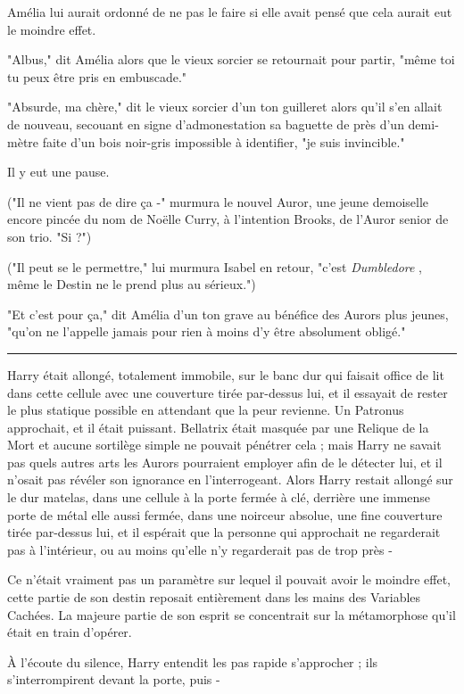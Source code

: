 Amélia lui aurait ordonné de ne pas le faire si elle avait pensé que cela aurait eut le moindre effet.

"Albus," dit Amélia alors que le vieux sorcier se retournait pour partir, "même toi tu peux être pris en embuscade."

"Absurde, ma chère," dit le vieux sorcier d'un ton guilleret alors qu'il s'en allait de nouveau, secouant en signe d'admonestation sa baguette de près d'un demi-mètre faite d'un bois noir-gris impossible à identifier, "je suis invincible."

Il y eut une pause.

("Il ne vient pas de dire ça -" murmura le nouvel Auror, une jeune demoiselle encore pincée du nom de Noëlle Curry, à l'intention Brooks, de l'Auror senior de son trio. "Si ?")

("Il peut se le permettre," lui murmura Isabel en retour, "c'est \emph{Dumbledore} , même le Destin ne le prend plus au sérieux.")

"Et c'est pour ça," dit Amélia d'un ton grave au bénéfice des Aurors plus jeunes, "qu'on ne l'appelle jamais pour rien à moins d'y être absolument obligé."
\par\noindent\rule{\textwidth}{0.4pt}
Harry était allongé, totalement immobile, sur le banc dur qui faisait office de lit dans cette cellule avec une couverture tirée par-dessus lui, et il essayait de rester le plus statique possible en attendant que la peur revienne. Un Patronus approchait, et il était puissant. Bellatrix était masquée par une Relique de la Mort et aucune sortilège simple ne pouvait pénétrer cela ; mais Harry ne savait pas quels autres arts les Aurors pourraient employer afin de le détecter lui, et il n'osait pas révéler son ignorance en l'interrogeant. Alors Harry restait allongé sur le dur matelas, dans une cellule à la porte fermée à clé, derrière une immense porte de métal elle aussi fermée, dans une noirceur absolue, une fine couverture tirée par-dessus lui, et il espérait que la personne qui approchait ne regarderait pas à l'intérieur, ou au moins qu'elle n'y regarderait pas de trop près -

Ce n'était vraiment pas un paramètre sur lequel il pouvait avoir le moindre effet, cette partie de son destin reposait entièrement dans les mains des Variables Cachées. La majeure partie de son esprit se concentrait sur la métamorphose qu'il était en train d'opérer.

À l'écoute du silence, Harry entendit les pas rapide s'approcher ; ils s'interrompirent devant la porte, puis -


